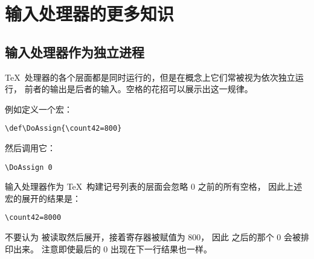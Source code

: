 \documentclass{book}
\begin{document}
\section{输入处理器的更多知识}

\subsection{输入处理器作为独立进程}

\TeX\ 处理器的各个层面都是同时运行的，但是在概念上它们常被视为依次独立运行，
前者的输出是后者的输入。空格的花招可以展示出这一规律。

例如定义一个宏：
\begin{verbatim}
\def\DoAssign{\count42=800}
\end{verbatim}
然后调用它：
\begin{verbatim}
\DoAssign 0
\end{verbatim}
输入处理器作为 \TeX\ 构建记号列表的层面会忽略 0 之前的所有空格，
因此上述宏的展开的结果是：
\begin{verbatim}
\count42=8000
\end{verbatim}
不要认为  被读取然后展开，接着寄存器被赋值为 800，
因此  之后的那个 0 会被排印出来。
注意即使最后的 0 出现在下一行结果也一样。
\end{document}
